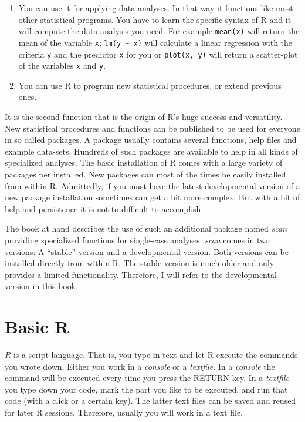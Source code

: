 \documentclass[
]{book}
\providecommand{\tightlist}{%
  \setlength{\itemsep}{0pt}\setlength{\parskip}{0pt}}
\begin{document}
\begin{enumerate}
\def\labelenumi{\arabic{enumi}.}
\tightlist
\item
  You can use it for applying data analyses. In that way it functions like most other statistical programs. You have to learn the specific syntax of R and it will compute the data analysis you need. For example \texttt{mean(x)} will return the mean of the variable \texttt{x}; \texttt{lm(y\ \textasciitilde{}\ x)} will calculate a linear regression with the criteria \texttt{y} and the predictor \texttt{x} for you or \texttt{plot(x,\ y)} will return a scatter-plot of the variables \texttt{x} and \texttt{y}.
\item
  You can use R to program new statistical procedures, or extend previous ones.
\end{enumerate}

It is the second function that is the origin of R's huge success and versatility. New statistical procedures and functions can be published to be used for everyone in so called packages. A package usually contains several functions, help files and example data-sets. Hundreds of such packages are available to help in all kinds of specialized analyses. The basic installation of R comes with a large variety of packages per installed. New packages can most of the times be easily installed from within R. Admittedly, if you must have the latest developmental version of a new package installation sometimes can get a bit more complex. But with a bit of help and persistence it is not to difficult to accomplish.

The book at hand describes the use of such an additional package named \emph{scan} providing specialized functions for single-case analyses. \emph{scan} comes in two versions: A ``stable'' version and a developmental version. Both versions can be installed directly from within R. The stable version is much older and only provides a limited functionality. Therefore, I will refer to the developmental version in this book.

\hypertarget{basic-r}{%
\section{Basic R}\label{basic-r}}

\emph{R} is a script language. That is, you type in text and let R execute the commands you wrote down. Either you work in a \emph{console} or a \emph{textfile}. In a \emph{console} the command will be executed every time you press the RETURN-key. In a \emph{textfile} you type down your code, mark the part you like to be executed, and run that code (with a click or a certain key). The latter text files can be saved and reused for later R sessions. Therefore, usually you will work in a text file.
\end{document}
